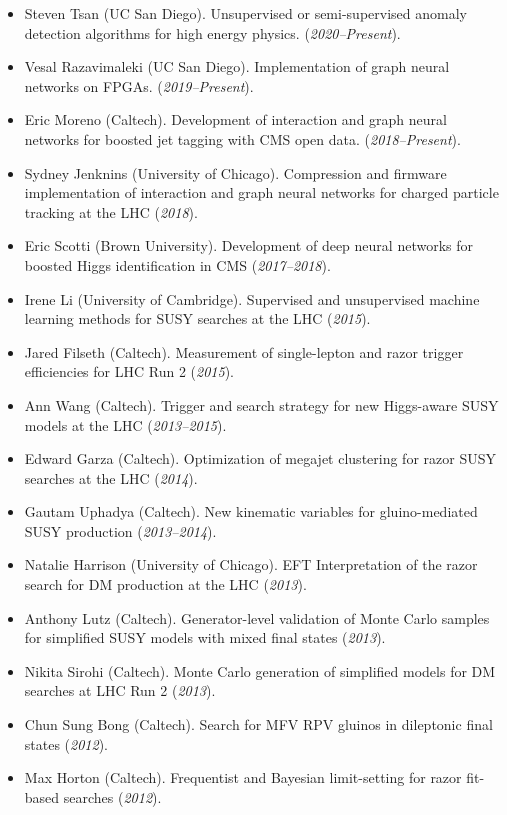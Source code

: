 \documentclass[11pt]{res}
\begin{document}
\begin{resume}
\begin{itemize}
\item Steven Tsan (UC San Diego). Unsupervised or semi-supervised anomaly detection algorithms for high energy physics. (\textit{2020--Present}).
\item Vesal Razavimaleki (UC San Diego). Implementation of graph neural networks on FPGAs. (\textit{2019--Present}).
\item Eric Moreno (Caltech). Development of interaction and graph neural networks for boosted jet tagging with CMS open data. (\textit{2018--Present}).
\item Sydney Jenknins (University of Chicago). Compression and firmware implementation of interaction and graph neural networks for charged particle tracking at the LHC (\textit{2018}).
\item Eric Scotti (Brown University). Development of deep neural networks for boosted Higgs identification in CMS (\textit{2017--2018}).
\item Irene Li (University of Cambridge). Supervised and unsupervised machine learning methods for SUSY searches at the LHC (\textit{2015}).
\item Jared Filseth (Caltech). Measurement of single-lepton and razor trigger efficiencies for LHC Run 2 (\textit{2015}).
\item Ann Wang (Caltech). Trigger and search strategy for new Higgs-aware SUSY models at the LHC (\textit{2013--2015}).
\item Edward Garza (Caltech). Optimization of megajet clustering for razor SUSY searches at the LHC (\textit{2014}).
\item Gautam Uphadya (Caltech). New kinematic variables for gluino-mediated SUSY production (\textit{2013--2014}).
\item Natalie Harrison (University of Chicago). EFT Interpretation of the razor search for DM production at the LHC (\textit{2013}).
\item Anthony Lutz (Caltech). Generator-level validation of Monte Carlo samples for simplified SUSY models with mixed final states (\textit{2013}).
\item Nikita Sirohi (Caltech). Monte Carlo generation of simplified models for DM searches at LHC Run 2 (\textit{2013}).
\item Chun Sung Bong (Caltech). Search for MFV RPV gluinos in dileptonic final states (\textit{2012}).
\item Max Horton (Caltech). Frequentist and Bayesian limit-setting for razor fit-based searches (\textit{2012}).
\end{itemize}


\end{resume}
\end{document}
